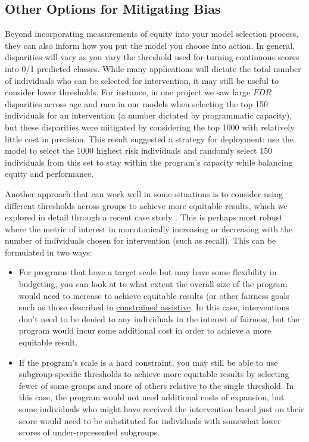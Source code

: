 \documentclass[]{krantz}
\begin{document}
\subsection{Other Options for Mitigating
Bias}\label{other-options-for-mitigating-bias}

Beyond incorporating measurements of equity into your model selection
process, they can also inform how you put the model you choose into
action. In general, disparities will vary as you vary the threshold used
for turning continuous scores into 0/1 predicted classes. While many
applications will dictate the total number of individuals who can be
selected for intervention, it may still be useful to consider lower
thresholds. For instance, in one project we saw large \(FDR\)
disparities across age and race in our models when selecting the top 150
individuals for an intervention (a number dictated by programmatic
capacity), but these disparities were mitigated by considering the top
1000 with relatively little cost in precision. This result suggested a
strategy for deployment: use the model to select the 1000 highest risk
individuals and randomly select 150 individuals from this set to stay
within the program's capacity while balancing equity and performance.

Another approach that can work well in some situations is to consider
using different thresholds across groups to achieve more equitable
results, which we explored in detail through a recent case study
\citep{Rodolfa2020}. This is perhaps most robust where the metric of
interest in monotonically increasing or decreasing with the number of
individuals chosen for intervention (such as recall). This can be
formulated in two ways:

\begin{itemize}
\item
  For programs that have a target scale but may have some flexibility in
  budgeting, you can look at to what extent the overall size of the
  program would need to increase to achieve equitable results (or other
  fairness goals such as those described in
  \protect\hyperlink{sec:constrainedassistive}{constrained assistive}.
  In this case, interventions don't need to be denied to any individuals
  in the interest of fairness, but the program would incur some
  additional cost in order to achieve a more equitable result.
\item
  If the program's scale is a hard constraint, you may still be able to
  use subgroup-specific thresholds to achieve more equitable results by
  selecting fewer of some groups and more of others relative to the
  single threshold. In this case, the program would not need additional
  costs of expansion, but some individuals who might have received the
  intervention based just on their score would need to be substituted
  for individuals with somewhat lower scores of under-represented
  subgroups.
\end{itemize}
\end{document}
